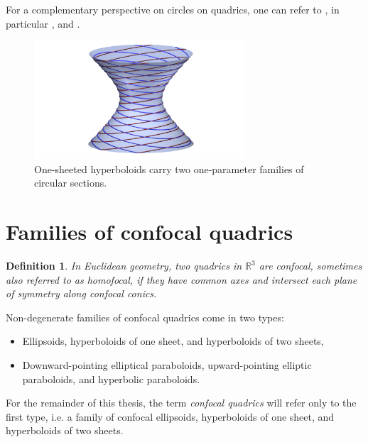 \documentclass[10pt, a4paper]{article}
\theoremstyle{BoldTopSpacing}
\theoremstyle{BoldTopSpacing}
\theoremstyle{BoldTopSpacing}
\theoremstyle{BoldTopBottomSpacing}
\newtheorem{definition}{Definition}[section]
\theoremstyle{BoldTopSpacing}
\theoremstyle{BoldTopBottomSpacing}
\theoremstyle{remark}
\begin{document}
\sloppy For a complementary perspective on circles on quadrics, one can refer to \cite{nilovSurfaceContainingLine2011}, in particular \cite[\textcolor{CitationColor}{Lemma~2.1.}]{nilovSurfaceContainingLine2011}, and \cite[\textcolor{CitationColor}{Lemma~2.6}]{nilovSurfaceContainingLine2011}.

\begin{figure}[H]
    \centering
    \includegraphics[width=0.7\textwidth]{circles_sections_of_one_sheeted_hyperboloid.png}
    \caption{One-sheeted hyperboloids carry two one-parameter families of circular sections.}
    \label{fig:circular_sections_one_sheeted}
\end{figure}

\pagebreak
\section{Families of confocal quadrics}
\label{sec:confocal-quadrics}

\begin{definition}
\label{def:confocal-quadrics}
In Euclidean geometry, two quadrics in $\mathbb{R}^3$ are \textit{confocal}, sometimes also referred to as \textit{homofocal}, if they have common axes and intersect each plane of symmetry along confocal conics.
\end{definition}

Non-degenerate families of confocal quadrics come in two types:
\begin{itemize}[label=$\blacktriangleright$]
    \item Ellipsoids, hyperboloids of one sheet, and hyperboloids of two sheets,
    \item Downward-pointing elliptical paraboloids, upward-pointing elliptic paraboloids, and hyperbolic paraboloids.
\end{itemize}
For the remainder of this thesis, the term \textit{confocal quadrics} will refer only to the first type, i.e. a family of confocal ellipsoids, hyperboloids of one sheet, and hyperboloids of two sheets. \par
\end{document}
